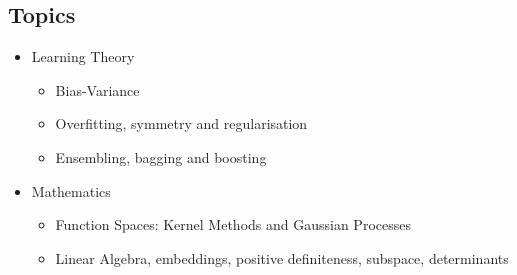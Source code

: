 
\begin{slide}
\section{Topics}

\begin{PauseHighLight}
  \begin{itemize}
  \item Learning Theory
    \begin{itemize}\squeeze
    \item Bias-Variance
    \item Overfitting, symmetry and regularisation
    \item Ensembling, bagging and boosting\pause
    \end{itemize}
  \item Mathematics
    \begin{itemize}\squeeze
    \item Function Spaces: Kernel Methods and Gaussian Processes
    \item Linear Algebra, embeddings, positive definiteness, subspace,
      determinants\pause
    \end{itemize}
  \end{itemize}
\end{PauseHighLight}

\end{slide}


